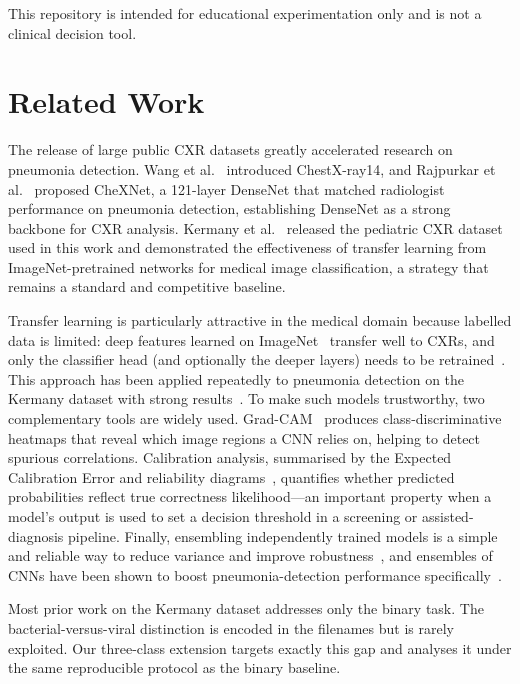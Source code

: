 \documentclass[runningheads]{llncs}
\begin{document}
This repository is intended for educational experimentation only and is
not a clinical decision tool.

\section{Related Work}

The release of large public CXR datasets greatly accelerated research on
pneumonia detection. Wang et al.~\cite{ref_chestxray14} introduced
ChestX-ray14, and Rajpurkar et al.~\cite{ref_chexnet} proposed CheXNet, a
121-layer DenseNet that matched radiologist performance on pneumonia
detection, establishing DenseNet as a strong backbone for CXR analysis.
Kermany et al.~\cite{ref_kermany} released the pediatric CXR dataset used
in this work and demonstrated the effectiveness of transfer learning from
ImageNet-pretrained networks for medical image classification, a strategy
that remains a standard and competitive baseline.

Transfer learning is particularly attractive in the medical domain because
labelled data is limited: deep features learned on ImageNet~\cite{ref_imagenet,ref_alexnet}
transfer well to CXRs, and only the classifier head (and optionally the
deeper layers) needs to be retrained~\cite{ref_kermany,ref_chexnet}. This
approach has been applied repeatedly to pneumonia detection on the Kermany
dataset with strong results~\cite{ref_rahman}. To make such models
trustworthy, two complementary tools are widely used. Grad-CAM~\cite{ref_gradcam}
produces class-discriminative heatmaps that reveal which image regions a CNN
relies on, helping to detect spurious correlations. Calibration analysis,
summarised by the Expected Calibration Error and reliability
diagrams~\cite{ref_calibration,ref_naeini}, quantifies whether predicted
probabilities reflect true correctness likelihood---an important property
when a model's output is used to set a decision threshold in a screening or
assisted-diagnosis pipeline. Finally, ensembling independently trained
models is a simple and reliable way to reduce variance and improve
robustness~\cite{ref_ensemble}, and ensembles of CNNs have been shown to
boost pneumonia-detection performance specifically~\cite{ref_kundu}.

Most prior work on the Kermany dataset addresses only the binary task. The
bacterial-versus-viral distinction is encoded in the filenames but is
rarely exploited. Our three-class extension targets exactly this gap and
analyses it under the same reproducible protocol as the binary baseline.
\end{document}
